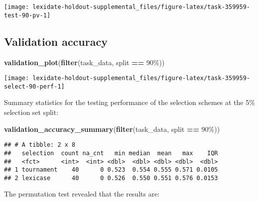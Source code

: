 \documentclass[
]{book}
\newenvironment{Shaded}{\begin{snugshade}}{\end{snugshade}}
\newcommand{\FunctionTok}[1]{\textcolor[rgb]{0.13,0.29,0.53}{\textbf{#1}}}
\newcommand{\NormalTok}[1]{#1}
\newcommand{\SpecialCharTok}[1]{\textcolor[rgb]{0.81,0.36,0.00}{\textbf{#1}}}
\newcommand{\StringTok}[1]{\textcolor[rgb]{0.31,0.60,0.02}{#1}}
\begin{document}
\texttt{[image: lexidate-holdout-supplemental\_files/figure-latex/task-359959-test-90-pv-1]}

\hypertarget{validation-accuracy-38}{%
\subsection{Validation accuracy}\label{validation-accuracy-38}}

\begin{Shaded}
\begin{Highlighting}[]
\FunctionTok{validation\_plot}\NormalTok{(}\FunctionTok{filter}\NormalTok{(task\_data, split }\SpecialCharTok{==} \StringTok{\textquotesingle{}90\%\textquotesingle{}}\NormalTok{))}
\end{Highlighting}
\end{Shaded}

\texttt{[image: lexidate-holdout-supplemental\_files/figure-latex/task-359959-select-90-perf-1]}

Summary statistics for the testing performance of the selection schemes at the 5\% selection set split:

\begin{Shaded}
\begin{Highlighting}[]
\FunctionTok{validation\_accuracy\_summary}\NormalTok{(}\FunctionTok{filter}\NormalTok{(task\_data, split }\SpecialCharTok{==} \StringTok{\textquotesingle{}90\%\textquotesingle{}}\NormalTok{))}
\end{Highlighting}
\end{Shaded}

\begin{verbatim}
## # A tibble: 2 x 8
##   selection  count na_cnt   min median  mean   max    IQR
##   <fct>      <int>  <int> <dbl>  <dbl> <dbl> <dbl>  <dbl>
## 1 tournament    40      0 0.523  0.554 0.555 0.571 0.0105
## 2 lexicase      40      0 0.526  0.550 0.551 0.576 0.0153
\end{verbatim}

The permutation test revealed that the results are:
\end{document}

